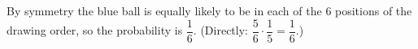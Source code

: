 By symmetry the blue ball is equally likely to be in each of the $6$ positions of the drawing order, so the probability is $\boxed{\dfrac{1}{6}}$. (Directly: $\dfrac{5}{6}\cdot\dfrac{1}{5}=\dfrac{1}{6}$.)
